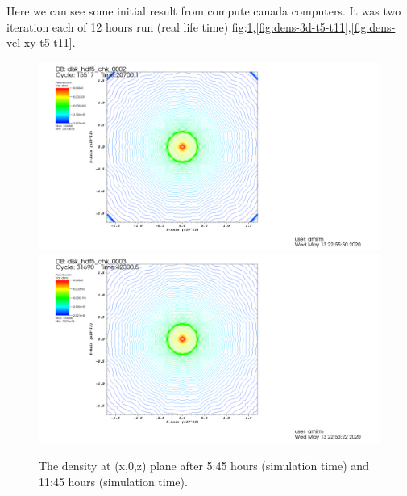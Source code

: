 \documentclass[12pt, a4paper]{article}
\begin{document}
Here we can see some initial result from compute canada computers.
It was two iteration each of 12 hours run (real life time) fig:\ref{fig:dens-xz-t5-t11},\ref{fig:dens-3d-t5-t11},\ref{fig:dens-vel-xy-t5-t11}.
\begin{figure}[ht!]
    \begin{center}
        \includegraphics[width=1.0\textwidth]{density-x-z-5-75.png}
        \includegraphics[width=1.0\textwidth]{density-x-z-11-75.png}
    \end{center}
    \caption{
        The density at (x,0,z) plane after 5:45 hours (simulation time) and 11:45 hours (simulation time).
    }\label{fig:dens-xz-t5-t11}
\end{figure}
\end{document}
